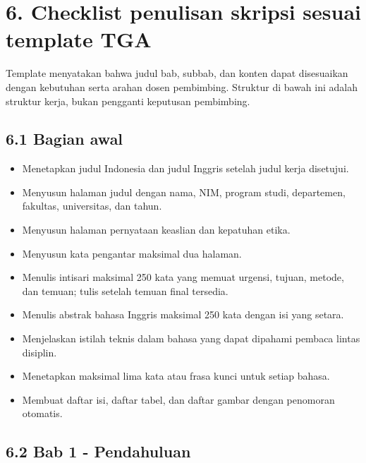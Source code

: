 \documentclass[
  indonesian,
  11pt,
]{article}
\providecommand{\tightlist}{%
  \setlength{\itemsep}{0pt}\setlength{\parskip}{0pt}}
\renewcommand{\tightlist}{%
  \setlength{\itemsep}{0.22em}%
  \setlength{\parskip}{0pt}%
}
\begin{document}
\section{6. Checklist penulisan skripsi sesuai template
TGA}\label{checklist-penulisan-skripsi-sesuai-template-tga}

Template menyatakan bahwa judul bab, subbab, dan konten dapat
disesuaikan dengan kebutuhan serta arahan dosen pembimbing. Struktur di
bawah ini adalah struktur kerja, bukan pengganti keputusan pembimbing.

\subsection{6.1 Bagian awal}\label{bagian-awal}

\begin{itemize}
\tightlist
\item[$\square$]
  Menetapkan judul Indonesia dan judul Inggris setelah judul kerja
  disetujui.
\item[$\square$]
  Menyusun halaman judul dengan nama, NIM, program studi, departemen,
  fakultas, universitas, dan tahun.
\item[$\square$]
  Menyusun halaman pernyataan keaslian dan kepatuhan etika.
\item[$\square$]
  Menyusun kata pengantar maksimal dua halaman.
\item[$\square$]
  Menulis intisari maksimal 250 kata yang memuat urgensi, tujuan,
  metode, dan temuan; tulis setelah temuan final tersedia.
\item[$\square$]
  Menulis abstrak bahasa Inggris maksimal 250 kata dengan isi yang
  setara.
\item[$\square$]
  Menjelaskan istilah teknis dalam bahasa yang dapat dipahami pembaca
  lintas disiplin.
\item[$\square$]
  Menetapkan maksimal lima kata atau frasa kunci untuk setiap bahasa.
\item[$\square$]
  Membuat daftar isi, daftar tabel, dan daftar gambar dengan penomoran
  otomatis.
\end{itemize}

\subsection{6.2 Bab 1 - Pendahuluan}\label{bab-1---pendahuluan}
\end{document}
